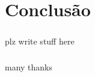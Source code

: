 \documentclass[11pt,a4paper]{report}
\begin{document}
\chapter{Conclusão}

\paragraph*{}plz write stuff here

\paragraph*{}many thanks
\end{document}
